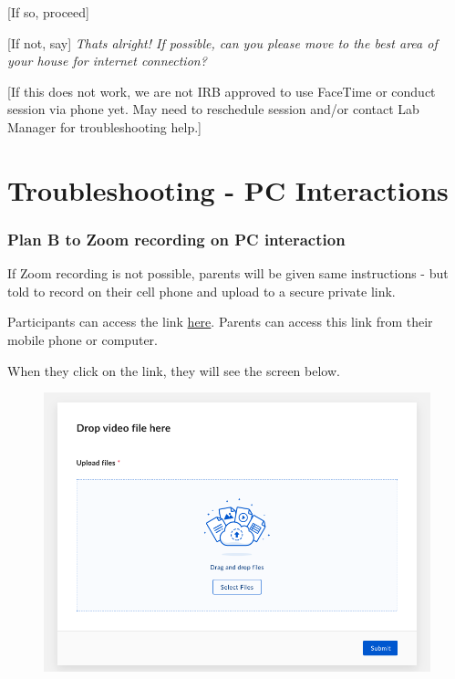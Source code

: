 \documentclass[]{book}
\begin{document}
{[}If so, proceed{]}

{[}If not, say{]} \emph{Thats alright! If possible, can you please move to the best area of your house for internet connection?}

{[}If this does not work, we are not IRB approved to use FaceTime or conduct session via phone yet. May need to reschedule session and/or contact Lab Manager for troubleshooting help.{]}

\hypertarget{troubleshooting---pc-interactions}{%
\section{Troubleshooting - PC Interactions}\label{troubleshooting---pc-interactions}}

\hypertarget{plan-b-to-zoom-recording-on-pc-interaction}{%
\subsubsection{Plan B to Zoom recording on PC interaction}\label{plan-b-to-zoom-recording-on-pc-interaction}}

If Zoom recording is not possible, parents will be given same instructions - but told to record on their cell phone and upload to a secure private link.

Participants can access the link \href{https://ucla.app.box.com/f/3c52df2afb1a446ab363b793f8af22c1}{here}. Parents can access this link from their mobile phone or computer.

When they click on the link, they will see the screen below.

\begin{figure}
\centering
\includegraphics{images/zoom_parent_child_interaction/13.png}
\caption{}
\end{figure}
\end{document}
